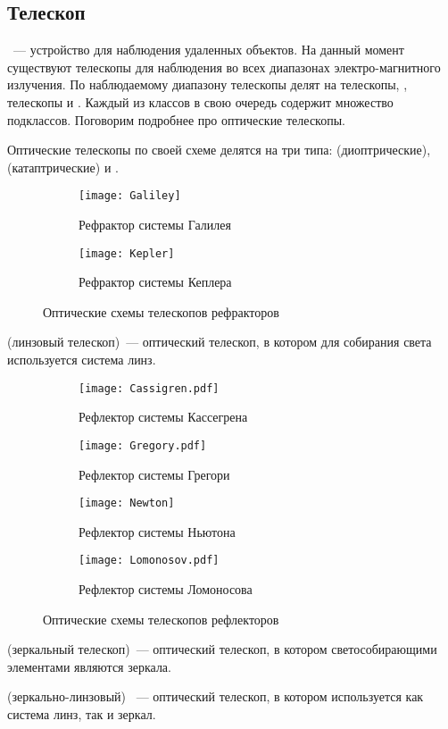 \subsection{Телескоп}
~--- устройство для наблюдения удаленных объектов. На данный момент существуют телескопы  для наблюдения во всех  диапазонах электро-магнитного излучения. По наблюдаемому диапазону телескопы делят на  телескопы, ,  телескопы и . Каждый из классов в свою очередь содержит множество подклассов. Поговорим подробнее про оптические телескопы.

Оптические телескопы по своей схеме делятся на три типа:  (диоптрические),  (катаптрические) и .

\vspace{-.3pc}
\begin{figure}[h!]
	\centering
	\begin{subfigure}{0.49\tw}
		\texttt{[image: Galiley]}
		\caption{Рефрактор системы Галилея}
	 \end{subfigure}
	 \hfill
	\begin{subfigure}{0.49\tw}
		\texttt{[image: Kepler]}
		\caption{Рефрактор системы Кеплера}
		 \label{Kepler}
	 \end{subfigure}
	 \caption{Оптические схемы телескопов рефракторов}
\end{figure}
 (линзовый телескоп)~---  оптический телескоп, в котором для собирания света используется система линз.

\vspace{-.3pc}
\begin{figure}[h!]
	 \begin{subfigure}{0.49\tw}
		\texttt{[image: Cassigren.pdf]}
		\caption{Рефлектор системы Кассегрена}
	 \end{subfigure}
	 \hfill
	 \begin{subfigure}{0.49\tw}
		\texttt{[image: Gregory.pdf]}
		\caption{Рефлектор системы Грегори}
		\label{Gregory}
	 \end{subfigure}
	 \vskip4pt
	\begin{subfigure}{0.49\tw}
		\texttt{[image: Newton]}
 		\caption{Рефлектор системы Ньютона}
	\end{subfigure}
	\hfill
	\begin{subfigure}{0.49\tw}
		\texttt{[image: Lomonosov.pdf]}
		\caption{Рефлектор системы Ломоносова}
	\end{subfigure}
	\caption{Оптические схемы телескопов рефлекторов}
\end{figure}
 (зеркальный телескоп)~---  оптический телескоп,  в котором светособирающими элементами являются зеркала.

 (зеркально-линзовый) ~--- оптический телескоп, в котором используется как система линз, так и зеркал.
